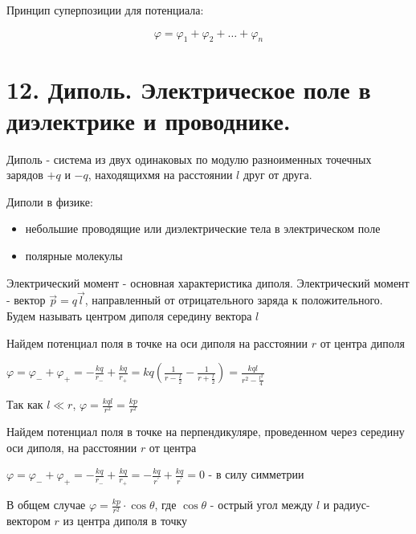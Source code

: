 \documentclass[12pt]{article}
\begin{document}
\mediumvspace

Принцип суперпозиции для потенциала:

\[\varphi = \varphi_1 + \varphi_2 + \dots + \varphi_n\]












\section{12. Диполь. Электрическое поле в диэлектрике и проводнике.}

\Def Диполь - система из двух одинаковых по модулю разноименных точечных зарядов $+q$ и $-q$, 
находящихмя на расстоянии $l$ друг от друга.

Диполи в физике:

\begin{itemize}
    \item небольшие проводящие или диэлектрические тела в электрическом поле

    \item полярные молекулы
\end{itemize}

Электрический момент - основная характеристика диполя. Электрический момент - вектор $\vec{p} = q\vec{l}$, 
направленный от отрицательного заряда к положительного. Будем называть центром диполя середину вектора $l$ 

 Найдем потенциал поля в точке на оси диполя на расстоянии $r$ от центра диполя

$\varphi = \varphi_- + \varphi_+ = -\frac{kq}{r_-} + \frac{kq}{r_+} = kq \left(\frac{1}{r - \frac{l}{2}} - \frac{1}{r + \frac{l}{2}}\right) = 
\frac{kql}{r^2 - \frac{l^2}{4}}$

Так как $l \ll r$, $\varphi = \frac{kql}{r^2} = \frac{kp}{r^2}$

 Найдем потенциал поля в точке на перпендикуляре, проведенном через середину оси диполя, на расстоянии $r$ от центра

$\varphi = \varphi_- + \varphi_+ = -\frac{kq}{r_-} + \frac{kq}{r_+} = -\frac{kq}{r^\prime} + \frac{kq}{r^\prime} = 0$ - в силу симметрии

 В общем случае $\varphi = \frac{kp}{r^2} \cdot \cos\theta$, 
где $\cos\theta$ - острый угол между $l$ и радиус-вектором $r$ из центра диполя в точку
\end{document}
